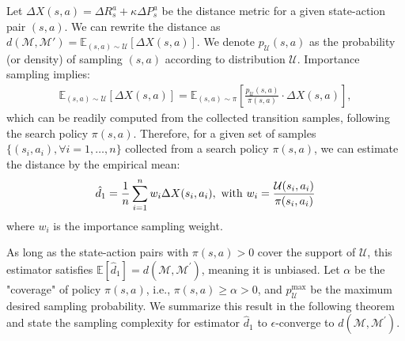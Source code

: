Let $\Delta X(s, a) = \Delta R_{s}^a + \kappa \Delta P_{s}^a$ be the distance metric for a given state-action pair $(s,a)$. We can rewrite the distance as $d(\mathcal{M},\mathcal{M}')=\mathbb{E}_{(s,a)\sim \mathcal{U}}[ \Delta X(s, a)]$. We denote $p_\mathcal{U}(s,a)$ as the probability (or density) of sampling $(s, a)$ according to distribution $\mathcal{U}$. Importance sampling implies:
\begin{equation}
\begin{aligned}
    \mathbb{E}_{(s,a)\sim \mathcal{U}} [\Delta X(s, a)] = \mathbb{E}_{(s,a)\sim \pi} \left[\frac{p_\mathcal{U}(s,a)}{\pi(s,a)}\cdot \Delta X(s, a)\right],
\end{aligned}
\end{equation}
which can be readily computed from the collected transition samples, following the search policy $\pi(s,a)$. Therefore, for a given set of samples $\{(s_i,a_i),\forall i=1,\ldots,n\}$ collected from a search policy $\pi(s,a)$, we can estimate the distance by the empirical mean:
\begin{equation}
\begin{aligned}
    \hat{d}_{1} = \frac{1}{n}\sum_{i=1}^{n} w_i \Delta X(s_i,a_i), \ {\rm with} \ w_i = \frac{\mathcal{U}(s_i,a_i)}{\pi(s_i,a_i)}
\end{aligned}
\end{equation}
where $w_i$ is the importance sampling weight.


As long as the state-action pairs with $\pi(s, a) > 0$ cover the support of $\mathcal{U}$, this estimator satisfies $\mathbb{E}[\hat{d}_{\mathcal{1}}] = d(\mathcal{M}, \mathcal{M}^{\prime})$, meaning it is unbiased.
Let $\alpha$ be the "coverage" of policy $\pi(s, a)$, i.e., $\pi(s, a) \geq \alpha > 0$, and $p_\mathcal{U}^{\max}$ be the maximum desired sampling probability.
We summarize this result in the following theorem and state the sampling complexity for estimator $\hat{d}_{1}$ to $\epsilon$-converge to $d(\mathcal{M}, \mathcal{M}^{\prime})$.




